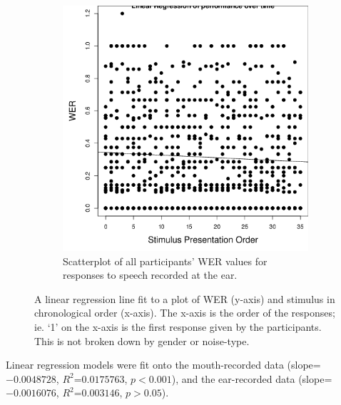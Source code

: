 \begin{figure}[ht]
\begin{subfigure}{0.47\textwidth}
\includegraphics[width=\maxwidth]{figure/line_graph_chrono-1} 

\caption{Scatterplot of all participants' WER values for responses to speech recorded at the ear.}
\label{fig:linear_performance_e}
\end{subfigure}
\caption{A linear regression line fit to a plot of WER (y-axis) and stimulus in chronological order (x-axis).  The x-axis is the order of the responses; ie. `1' on the x-axis is the first response given by the participants.  This is not broken down by gender or noise-type.}
\end{figure}
%
Linear regression models were fit onto the mouth-recorded data (slope=$-0.0048728$, $R^2$=$0.0175763$, $p<0.001$), and the ear-recorded data (slope=$-0.0016076$, $R^2$=$0.003146$, $p>0.05$). 

